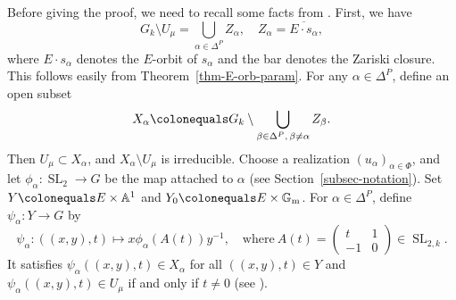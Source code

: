 \documentclass[10pt,a4paper]{article}
\numberwithin{equation}{section}
\theoremstyle{definition}
\theoremstyle{remark}
\renewcommand{\AA}{\mathbb{A}}
\newcommand{\GG}{\mathbb{G}}
\DeclareMathOperator{\SL}{SL}
\begin{document}
Before giving the proof, we need to recall some facts from \cite[Section~3.1]{Imai-Koskivirta-vector-bundles}. First, we have
\begin{equation}\label{GminusU}
    G_k \setminus U_{\mu} = \bigcup_{\alpha \in \Delta^P} Z_\alpha, \quad Z_\alpha=\overline{E\cdot s_\alpha}, 
\end{equation}
where $E\cdot s_\alpha$ denotes the $E$-orbit of $s_{\alpha}$ and the bar denotes the Zariski closure. This follows easily from Theorem~\ref{thm-E-orb-param}. For any $\alpha\in \Delta^P$, define an open subset 
\begin{equation}
X_\alpha  \colonequals  G_k \setminus \bigcup_{\beta\in \Delta^P,\, \beta\neq \alpha}Z_\beta.
\end{equation}
Then $U_{\mu}\subset X_\alpha$, and $X_{\alpha}\setminus U_{\mu}$ is irreducible. Choose a realization
$(u_{\alpha})_{\alpha \in \Phi}$, and let $\phi_{\alpha}\colon \SL_2\to G$ be the map attached to $\alpha$ (see Section~\ref{subsec-notation}). Set $Y\colonequals E \times \AA^1$ and $Y_0\colonequals E\times \GG_{\mathrm{m}}$. For $\alpha\in \Delta^P$, define $\psi_\alpha \colon Y \to G$ by
\begin{equation}\label{phia}
\psi_\alpha \colon ((x,y),t)\longmapsto x \phi_{\alpha} \left(A(t)\right)y^{-1}, \quad \textrm{where} \ A(t)=\left(
\begin{matrix}
t & 1 \\ -1 & 0 \end{matrix}
\right)\in \SL_{2,k}.
\end{equation}
It satisfies $\psi_\alpha((x,y),t)\in X_\alpha$ for all $((x,y),t)\in Y$ and $\psi_\alpha((x,y),t)\in U_\mu$ if and only if $t\neq 0 $ (see \cite[Proposition 3.1.4]{Imai-Koskivirta-vector-bundles}).
\end{document}
